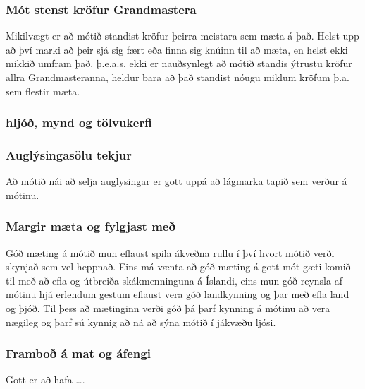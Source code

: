 \documentclass[11pt]{article}
\begin{document}
   
\subsubsection{Mót stenst kröfur Grandmastera}
\label{sec-1-2-4}


  Mikilvægt er að mótið standist kröfur þeirra meistara sem mæta á það.  Helst upp að því marki að þeir
sjá sig fært eða finna sig knúinn til að mæta, en helst ekki mikkið umfram það.  þ.e.a.s. ekki er 
nauðsynlegt að mótið standis ýtrustu kröfur allra Grandmasteranna, heldur bara að það standist nóugu 
miklum kröfum þ.a. sem flestir mæta. 
\subsubsection{hljóð, mynd og tölvukerfi}
\label{sec-1-2-5}
\subsubsection{Auglýsingasölu tekjur}
\label{sec-1-2-6}


Að mótið nái að selja auglysingar er gott uppá að lágmarka tapið sem verður á mótinu.  
\subsubsection{Margir mæta og fylgjast með}
\label{sec-1-2-7}


 Góð mæting á mótið mun eflaust spila ákveðna rullu í því hvort mótið verði skynjað sem vel heppnað.  Eins
má vænta að góð mæting á gott mót gæti komið til með að efla og útbreiða skákmenninguna á Íslandi, eins 
mun góð reynsla af mótinu hjá erlendum gestum eflaust vera góð landkynning og þar með efla land og þjóð.
 Til þess að mætinginn verði góð þá þarf kynning á mótinu að vera nægileg og þarf sú kynnig að ná að sýna
mótið í jákvæðu ljósi.
\subsubsection{Framboð á mat og áfengi}
\label{sec-1-2-8}


Gott er að hafa \ldots{}.
\end{document}
